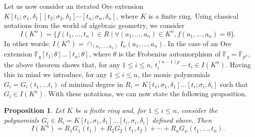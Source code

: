 \documentclass{amsproc}
\newcommand{\de}{\delta}
\newcommand{\si}{\sigma}
\newtheorem{proposition}[theorem]{Proposition}
\numberwithin{equation}{section}
\newcommand{\mulo}{K[t_1;\si_1,\de_1][t_2;\si_2,\de_2]\cdots[t_n;\si_n,\de_n]}
\begin{document}
Let us now consider an iterated Ore extension $\mulo$, where $K$ is a finite ring.   Using classical notations from the world of algebraic geometry, we consider 
$$
I(K^n)=\{f(t_1,\dots,t_n)\in R \mid \forall (a_1,\dots,a_n)\in K^n, f(a_1,\dots,a_n)=0\}.
$$
In other words: $I(K^n)=\cap_{(a_1,\dots,a_n)}I_n(a_1,\dots,a_n)$.
In the case of an Ore extension 
$\mathbb F_q[t_1;\theta]\dots [t_n;\theta]$, where $\theta$ is the Frobenius automorphism of $\mathbb F_q=\mathbb F_{p^n}$, the above theorem shows that, for any $1\le i \le n$,  $t_i^{(n-1)p}-t_i\in I(K^n)$. 
Having this in mind we introduce, for any $1\le i \le n$, the monic polynomials $G_i=G_i(t_1,\dots t_i)$ of minimal degree in $R_i=K[t_1;\si_1,\de_1]\dots [t_i;\si_i,\de_i]$ such that $G_i\in I(K^n)$.  With these notations, we can now state the following proposition.
\begin{proposition}
	\label{I(K^n)}
	Let $K$ be a finite ring and, for $1\le i \le n$, consider the polynomials $G_i\in R_i=K[t_1,\si_1,\de_1]\dots [t_i,\si_i,\de_i]$ defined above.
	Then 
	$$I(K^n)=R_1G_1(t_1)+R_2G_2(t_1,t_2)+ \cdots + R_nG_n(t_1,\dots,t_n).$$ 
\end{proposition}
\end{document}

